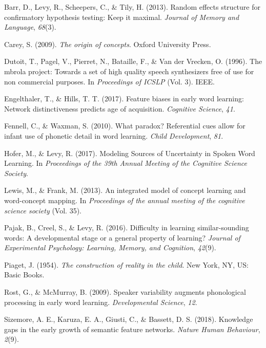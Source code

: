 \documentclass[10pt, letterpaper]{article}
\begin{document}
\setlength{\parindent}{-0.1in} \setlength{\leftskip}{0.125in} \noindent

\hypertarget{refs}{}
\hypertarget{ref-barr2013}{}
Barr, D., Levy, R., Scheepers, C., \& Tily, H. (2013). Random effects
structure for confirmatory hypothesis testing: Keep it maximal.
\emph{Journal of Memory and Language}, \emph{68}(3).

\hypertarget{ref-carey2009}{}
Carey, S. (2009). \emph{The origin of concepts}. Oxford University
Press.

\hypertarget{ref-dutoit1996}{}
Dutoit, T., Pagel, V., Pierret, N., Bataille, F., \& Van der Vrecken, O.
(1996). The mbrola project: Towards a set of high quality speech
synthesizers free of use for non commercial purposes. In
\emph{Proceedings of ICSLP} (Vol. 3). IEEE.

\hypertarget{ref-engelthaler2017}{}
Engelthaler, T., \& Hills, T. T. (2017). Feature biases in early word
learning: Network distinctiveness predicts age of acquisition.
\emph{Cognitive Science}, \emph{41}.

\hypertarget{ref-fennell2010}{}
Fennell, C., \& Waxman, S. (2010). What paradox? Referential cues allow
for infant use of phonetic detail in word learning. \emph{Child
Development}, \emph{81}.

\hypertarget{ref-hofer2017}{}
Hofer, M., \& Levy, R. (2017). Modeling Sources of Uncertainty in Spoken
Word Learning. In \emph{Proceedings of the 39th Annual Meeting of the
Cognitive Science Society}.

\hypertarget{ref-lewis2013}{}
Lewis, M., \& Frank, M. (2013). An integrated model of concept learning
and word-concept mapping. In \emph{Proceedings of the annual meeting of
the cognitive science society} (Vol. 35).

\hypertarget{ref-pajak2016}{}
Pajak, B., Creel, S., \& Levy, R. (2016). Difficulty in learning
similar-sounding words: A developmental stage or a general property of
learning? \emph{Journal of Experimental Psychology: Learning, Memory,
and Cognition}, \emph{42}(9).

\hypertarget{ref-piaget1954}{}
Piaget, J. (1954). \emph{The construction of reality in the child}. New
York, NY, US: Basic Books.

\hypertarget{ref-rost2009}{}
Rost, G., \& McMurray, B. (2009). Speaker variability augments
phonological processing in early word learning. \emph{Developmental
Science}, \emph{12}.

\hypertarget{ref-sizemore2018}{}
Sizemore, A. E., Karuza, E. A., Giusti, C., \& Bassett, D. S. (2018).
Knowledge gaps in the early growth of semantic feature networks.
\emph{Nature Human Behaviour}, \emph{2}(9).
\end{document}
